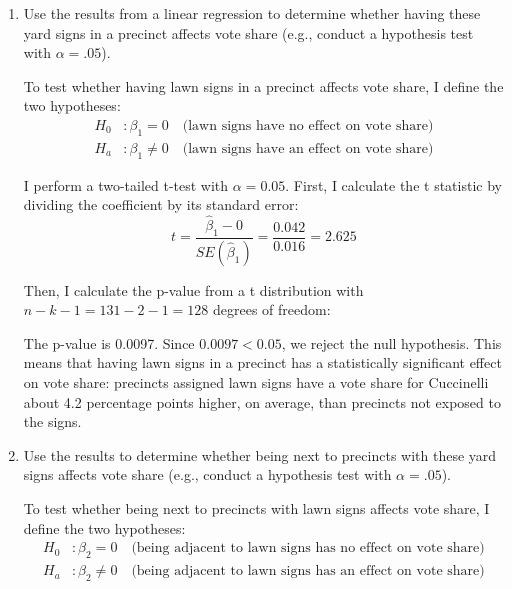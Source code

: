 \documentclass[12pt,letterpaper]{article}
\begin{document}
\vspace{.5cm}
\begin{enumerate}
	\item [(a)] Use the results from a linear regression to determine whether having these yard signs in a precinct affects vote share (e.g., conduct a hypothesis test with $\alpha = .05$).
	
	\noindent To test whether having lawn signs in a precinct affects vote share, I define the two hypotheses:
	\begin{align*}
		H_0&: \beta_1 = 0 \quad \text{(lawn signs have no effect on vote share)} \\
		H_a&: \beta_1 \neq 0 \quad \text{(lawn signs have an effect on vote share)}
	\end{align*}
	
	\noindent I perform a two-tailed t-test with $\alpha = 0.05$. First, I calculate the t statistic by dividing the coefficient by its standard error:
	\begin{equation*}
		t = \frac{\hat{\beta}_1 - 0}{SE(\hat{\beta}_1)} = \frac{0.042}{0.016} = 2.625
	\end{equation*}
	
	\noindent Then, I calculate the p-value from a t distribution with $n - k - 1 = 131 - 2 - 1 = 128$ degrees of freedom:
	
	
	
	\noindent The p-value is 0.0097. Since $0.0097 < 0.05$, we reject the null hypothesis. This means that having lawn signs in a precinct has a statistically significant effect on vote share: precincts assigned lawn signs have a vote share for Cuccinelli about 4.2 percentage points higher, on average, than precincts not exposed to the signs.
	
	\vspace{1cm}	
	\item [(b)]  Use the results to determine whether being
	next to precincts with these yard signs affects vote
	share (e.g., conduct a hypothesis test with $\alpha = .05$).
	
	\noindent To test whether being next to precincts with lawn signs affects vote share, I define the two hypotheses:
	\begin{align*}
		H_0&: \beta_2 = 0 \quad \text{(being adjacent to lawn signs has no effect on vote share)} \\
		H_a&: \beta_2 \neq 0 \quad \text{(being adjacent to lawn signs has an effect on vote share)}
	\end{align*}
	

\end{enumerate}
\end{document}
